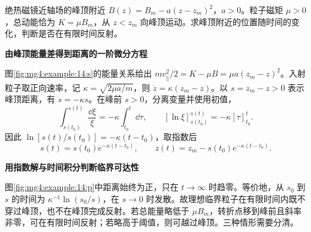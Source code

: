 \begin{question}\begin{example}[磁镜峰顶的临界到达时间]\label{mg4:example:14}
绝热磁镜近轴场的峰顶附近 $B(z)=B_m-a(z-z_m)^2$，$a>0$。粒子磁矩 $\mu>0$，总动能恰为 $K=\mu B_m$，从 $z<z_m$ 向峰顶运动。求峰顶附近的位置随时间的变化，判断是否在有限时间反射。
\end{example}
\end{question}
\begin{solution}\textbf{由峰顶能量差得到距离的一阶微分方程}\par\nobreak
图\ref{fig:mg4:example:14:s}的能量关系给出 $mv_\parallel^2/2=K-\mu B=\mu a(z_m-z)^2$。入射粒子取正向速率，记 $\kappa=\sqrt{2\mu a/m}$，则 $\dot z=\kappa(z_m-z)$。以 $s=z_m-z>0$ 表示峰顶距离，有 $\dot s=-\kappa s$。在峰前 $s>0$，分离变量并使用初值，
\[
 \int_{s(t_0)}^{s(t)}\frac{\dd\xi}{\xi}
 =-\kappa\int_{t_0}^t\dd\tau,\qquad
 [\ln\xi]_{s(t_0)}^{s(t)}=-\kappa[\tau]_{t_0}^{t}.
\]
因此 $\ln[s(t)/s(t_0)]=-\kappa(t-t_0)$，取指数后
\[
s(t)=s(t_0)e^{-\kappa(t-t_0)},\qquad z(t)=z_m-s(t_0)e^{-\kappa(t-t_0)}.
\]



\par\medskip{}\noindent\textbf{用指数解与时间积分判断临界可达性}\par\nobreak
图\ref{fig:mg4:example:14:p}中距离始终为正，只在 $t\to\infty$ 时趋零。等价地，从 $s_0$ 到 $s$ 的时间为 $\kappa^{-1}\ln(s_0/s)$，在 $s\to0$ 时发散。故理想临界粒子在有限时间内既不穿过峰顶，也不在峰顶完成反射。若总能量略低于 $\mu B_m$，转折点移到峰前且斜率非零，可在有限时间反射；若略高于阈值，则可越过峰顶。三种情形需要分清。\end{solution}
